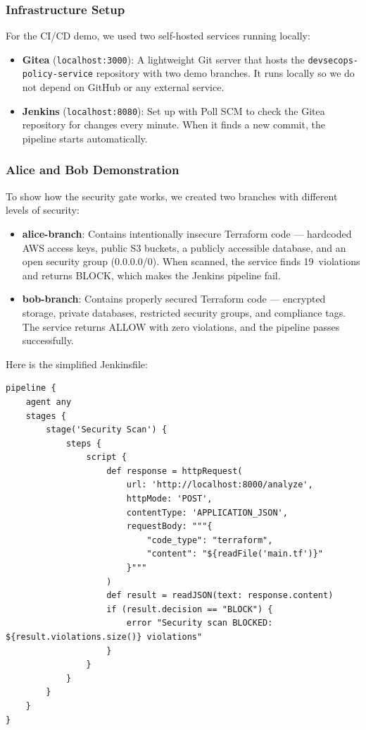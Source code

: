 \subsubsection{Infrastructure Setup}

For the CI/CD demo, we used two self-hosted services running locally:

\begin{itemize}[leftmargin=1.5cm]
  \item \textbf{Gitea} (\texttt{localhost:3000}): A lightweight Git server that hosts the \texttt{devsecops-policy-service} repository with two demo branches. It runs locally so we do not depend on GitHub or any external service.
  \item \textbf{Jenkins} (\texttt{localhost:8080}): Set up with Poll SCM to check the Gitea repository for changes every minute. When it finds a new commit, the pipeline starts automatically.
\end{itemize}

\subsubsection{Alice and Bob Demonstration}

To show how the security gate works, we created two branches with different levels of security:

\begin{itemize}[leftmargin=1.5cm]
  \item \textbf{alice-branch}: Contains intentionally insecure Terraform code --- hardcoded AWS access keys, public S3 buckets, a publicly accessible database, and an open security group (0.0.0.0/0). When scanned, the service finds 19~violations and returns BLOCK, which makes the Jenkins pipeline fail.
  
  \item \textbf{bob-branch}: Contains properly secured Terraform code --- encrypted storage, private databases, restricted security groups, and compliance tags. The service returns ALLOW with zero violations, and the pipeline passes successfully.
\end{itemize}

Here is the simplified Jenkinsfile:

\begin{lstlisting}[language={}, caption={Jenkinsfile pipeline logic (simplified).}, label={lst:jenkinsfile}]
pipeline {
    agent any
    stages {
        stage('Security Scan') {
            steps {
                script {
                    def response = httpRequest(
                        url: 'http://localhost:8000/analyze',
                        httpMode: 'POST',
                        contentType: 'APPLICATION_JSON',
                        requestBody: """{
                            "code_type": "terraform",
                            "content": "${readFile('main.tf')}"
                        }"""
                    )
                    def result = readJSON(text: response.content)
                    if (result.decision == "BLOCK") {
                        error "Security scan BLOCKED: ${result.violations.size()} violations"
                    }
                }
            }
        }
    }
}
\end{lstlisting}

